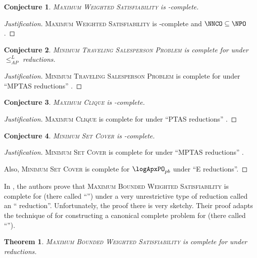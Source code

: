 \documentclass[]{article}
\theoremstyle{plain}
\newtheorem{conjecture}{Conjecture}
\newtheorem{theorem}{Theorem}
\theoremstyle{definition}
\newenvironment{justification}{\begin{proof}[Justification]}{\end{proof}}
\newcommand{\APr}{\leq_{AP}^{L}}
\begin{document}
\begin{conjecture}
  \textsc{Maximum Weighted Satisfiability} is \NNCO-complete.
\end{conjecture}
\begin{justification}
  \textsc{Maximum Weighted Satisfiability} is \NPO-complete \cite{ckst95} and $\NNCO\subseteq\NPO$.
\end{justification}

\begin{conjecture}
  \textsc{Minimum Traveling Salesperson Problem} is complete for \expApxNCO{} under $\APr$ reductions.
\end{conjecture}
\begin{justification}
  \textsc{Minimum Traveling Salesperson Problem} is complete for \expApxPO{} under ``MPTAS reductions'' \cite[Corollary~1]{ep06}.
\end{justification}

\begin{conjecture}
  \textsc{Maximum Clique} is \polyApxNCO-complete.
\end{conjecture}
\begin{justification}
  \textsc{Maximum Clique} is complete for \polyApxPO{} under ``PTAS reductions'' \cite[Example~2.48]{cks01} \cite{kmsv99} \cite{ep10}.
\end{justification}

\begin{conjecture}
  \textsc{Minimum Set Cover} is \logApxNCO-complete.
\end{conjecture}
\begin{justification}
  \textsc{Minimum Set Cover} is complete for \logApxPO{} under ``MPTAS reductions'' \cite[Example~2.48]{cks01} \cite[Theorem~5]{ep06} \cite[Theorem~27]{ep10}.

  Also, \textsc{Minimum Set Cover} is complete for $\logApxPO_{pb}$ under ``E reductions''.
\end{justification}

In \cite{sx95}, the authors prove that \textsc{Maximum Bounded Weighted Satisfiability} is complete for \ApxNCO{} (there called ``\NCX'') under a very unrestrictive type of reduction called an ``\NCAS{} reduction''.
Unfortunately, the proof there is very sketchy.
Their proof adapts the technique of \cite{cp91} for constructing a canonical complete problem for \ApxPO{} (there called ``\APX'').

\begin{theorem}
  \textsc{Maximum Bounded Weighted Satisfiability} is complete for \ApxNCO{} under \NCAS{} reductions.
\end{theorem}
\end{document}
